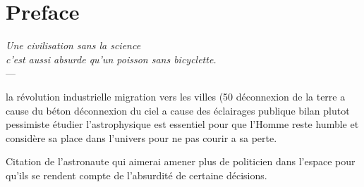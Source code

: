 
\chapter*{Preface}


\begin{flushright}{\slshape    
	Une civilisation sans la science \\
	c'est aussi absurde qu'un poisson sans bicyclette.} \\ \medskip 
    ---   
    \cite{Desproges}
\end{flushright}


la révolution industrielle
migration vers les villes (50%
déconnexion de la terre a cause du béton
déconnexion du ciel a cause des éclairages publique
bilan plutot pessimiste
étudier l'astrophysique est essentiel pour que l'Homme reste humble et considère sa place dans l'univers pour ne pas courir a sa perte.

Citation de l'astronaute qui aimerai amener plus de politicien dans l'espace pour qu'ils se rendent compte de l'absurdité de certaine décisions.